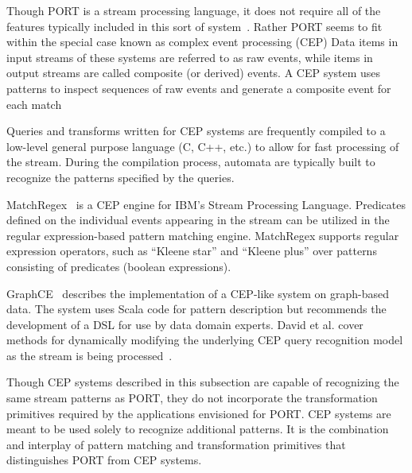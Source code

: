 Though PORT is a stream processing language, it does not
require all of the features typically
included in this sort of system~\cite{DBLP:journals/csur/DayarathnaP18}.
Rather PORT seems to fit within the special case
known as complex event processing (CEP) 
Data items in input streams of these systems are referred to as raw events, while items in output streams are called
composite (or derived) events. A CEP system uses patterns to inspect
sequences of raw events and generate a composite event for each
match~\cite{DBLP:journals/ibmrd/HirzelAGJKKMNSSW13}

Queries and transforms written for CEP systems are
frequently compiled to a low-level general purpose language (C, C++, etc.) to allow for fast
processing of the stream. During the compilation process, automata are typically
built to recognize the patterns specified by the queries.

MatchRegex~\cite{DBLP:conf/debs/Hirzel12} is a CEP engine for IBM’s Stream Processing
Language. Predicates defined on the individual events appearing in the
stream can be utilized in the regular expression-based pattern matching
engine. MatchRegex supports regular expression operators, such as “Kleene star”
and “Kleene plus” over patterns consisting of predicates (boolean expressions).

GraphCE~\cite{DBLP:conf/models/BarqueroBTV18} describes the implementation of a CEP-like system on graph-based data. The system uses Scala code for pattern description but recommends the development of a DSL for use by data domain experts.
David et al. cover methods for dynamically modifying the underlying CEP query recognition model as the stream is being processed~\cite{DBLP:journals/sosym/DavidRV18}.

Though CEP systems described in this subsection are capable
of recognizing the same stream patterns as PORT, they
do not incorporate the
transformation primitives 
required by the applications
envisioned for PORT. CEP systems are meant
to be used solely to recognize additional patterns.
It is the combination and interplay of pattern matching and transformation
primitives that distinguishes PORT from CEP systems.

\vspace{-.5cm}

